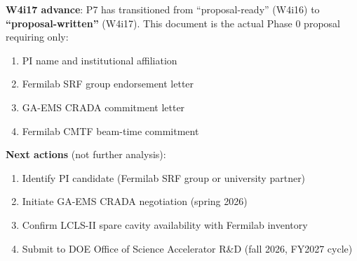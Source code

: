 \documentclass[11pt]{article}
\begin{document}
\textbf{W4i17 advance}: P7 has transitioned from ``proposal-ready''
(W4i16) to \textbf{``proposal-written''} (W4i17). This document is the
actual Phase 0 proposal requiring only:
\begin{enumerate}[nosep]
  \item PI name and institutional affiliation
  \item Fermilab SRF group endorsement letter
  \item GA-EMS CRADA commitment letter
  \item Fermilab CMTF beam-time commitment
\end{enumerate}

\textbf{Next actions} (not further analysis):
\begin{enumerate}[nosep]
  \item Identify PI candidate (Fermilab SRF group or university partner)
  \item Initiate GA-EMS CRADA negotiation (spring 2026)
  \item Confirm LCLS-II spare cavity availability with Fermilab inventory
  \item Submit to DOE Office of Science Accelerator R\&D (fall 2026, FY2027 cycle)
\end{enumerate}
\end{document}
